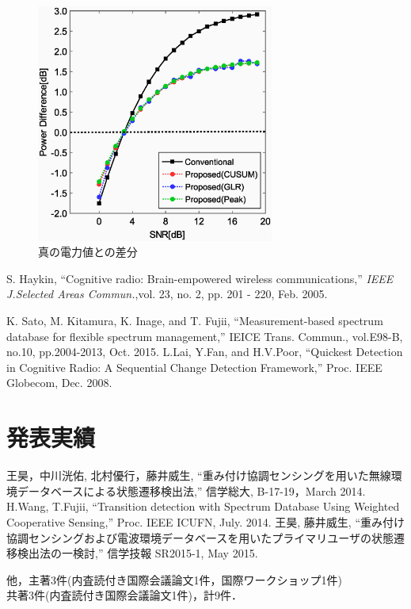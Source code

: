 \documentclass[10pt, twocolumn, a4j]{jsarticle}
\begin{document}
\begin{figure}[t]
\centering
\includegraphics[width=78mm]{peak.eps}
\caption{真の電力値との差分}
\label{Powdiff}
\end{figure}

\begin{thebibliography}{9}
  \scriptsize{
   S. Haykin, ``Cognitive radio: Brain-empowered wireless communications,'' {\it IEEE J.Selected Areas Commun.},vol. 23, no. 2, pp. 201 - 220, Feb. 2005.

   K. Sato, M. Kitamura, K. Inage, and T. Fujii, ``Measurement-based spectrum database for flexible spectrum management,'' IEICE Trans. Commun., vol.E98-B, no.10, pp.2004-2013, Oct. 2015.
   L.Lai, Y.Fan, and H.V.Poor, ``Quickest Detection in Cognitive Radio: A Sequential Change Detection Framework,'' Proc. IEEE Globecom, Dec. 2008.
  }
\end{thebibliography}
\vspace{-5mm}
\section*{発表実績}
\noindent
\scriptsize{
  \begin{enumerate}[{[}A{]}]
    王昊，中川洸佑, 北村優行，藤井威生, ``重み付け協調センシングを用いた無線環境データベースによる状態遷移検出法,'' 信学総大, B-17-19，March 2014.
    H.Wang, T.Fujii, ``Transition detection with Spectrum Database Using Weighted Cooperative Sensing,'' Proc. IEEE ICUFN, July. 2014.
    王昊,  藤井威生, ``重み付け協調センシングおよび電波環境データベースを用いたプライマリユーザの状態遷移検出法の一検討,'' 信学技報 SR2015-1, May 2015.

他，主著3件(内査読付き国際会議論文1件，国際ワークショップ1件)\\
共著3件(内査読付き国際会議論文1件)，計9件．
  \end{enumerate}
}
\end{document}
